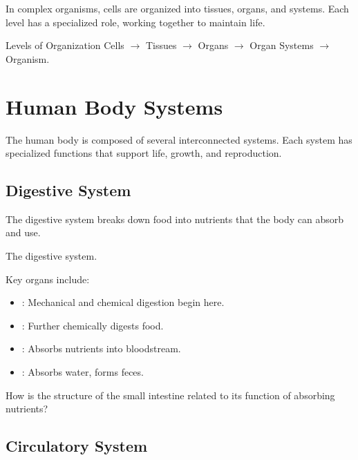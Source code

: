 In complex organisms, cells are organized into tissues, organs, and systems. Each level has a specialized role, working together to maintain life.

\begin{keyconcept}{Levels of Organization}
Cells $\rightarrow$ Tissues $\rightarrow$ Organs $\rightarrow$ Organ Systems $\rightarrow$ Organism.
\end{keyconcept}

\section{Human Body Systems}

The human body is composed of several interconnected systems. Each system has specialized functions that support life, growth, and reproduction.

\subsection{Digestive System}

The digestive system breaks down food into nutrients that the body can absorb and use.

\begin{marginfigure}
\caption{The digestive system.}
\end{marginfigure}

Key organs include:

\begin{itemize}
    \item {}: Mechanical and chemical digestion begin here.
    \item {}: Further chemically digests food.
    \item {}: Absorbs nutrients into bloodstream.
    \item {}: Absorbs water, forms feces.
\end{itemize}

\begin{stopandthink}
How is the structure of the small intestine related to its function of absorbing nutrients?
\end{stopandthink}

\subsection{Circulatory System}

